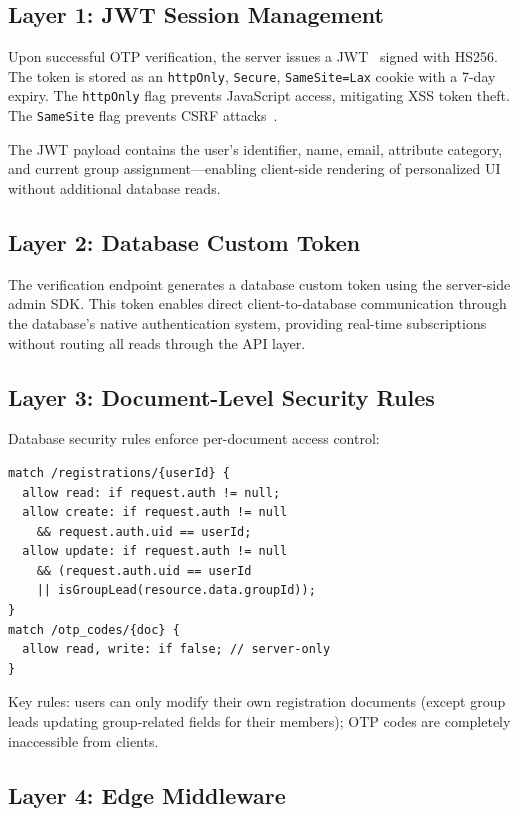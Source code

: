 \documentclass[11pt,a4paper]{article}
\theoremstyle{plain}
\theoremstyle{definition}
\begin{document}
\subsection{Layer 1: JWT Session Management}

Upon successful OTP verification, the server issues a JWT~\cite{jones2015} signed with HS256. The token is stored as an \texttt{httpOnly}, \texttt{Secure}, \texttt{SameSite=Lax} cookie with a 7-day expiry. The \texttt{httpOnly} flag prevents JavaScript access, mitigating XSS token theft. The \texttt{SameSite} flag prevents CSRF attacks~\cite{barth2008}.

The JWT payload contains the user's identifier, name, email, attribute category, and current group assignment---enabling client-side rendering of personalized UI without additional database reads.

\subsection{Layer 2: Database Custom Token}

The verification endpoint generates a database custom token using the server-side admin SDK. This token enables direct client-to-database communication through the database's native authentication system, providing real-time subscriptions without routing all reads through the API layer.

\subsection{Layer 3: Document-Level Security Rules}

Database security rules enforce per-document access control:
\begin{lstlisting}[language={}, caption={Document-level security rules (excerpt)}, label={lst:rules}]
match /registrations/{userId} {
  allow read: if request.auth != null;
  allow create: if request.auth != null
    && request.auth.uid == userId;
  allow update: if request.auth != null
    && (request.auth.uid == userId
    || isGroupLead(resource.data.groupId));
}
match /otp_codes/{doc} {
  allow read, write: if false; // server-only
}
\end{lstlisting}

Key rules: users can only modify their own registration documents (except group leads updating group-related fields for their members); OTP codes are completely inaccessible from clients.

\subsection{Layer 4: Edge Middleware}
\end{document}
